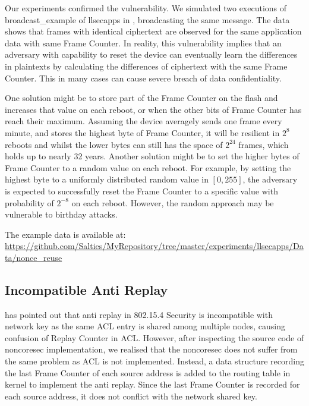 Our experiments confirmed the vulnerability. We simulated two executions of  broadcast\_example of llsecapps in , broadcasting the same message. The data shows that frames with identical ciphertext are observed for the same application data with same Frame Counter. In reality, this vulnerability implies that an adversary with capability to reset the device can eventually learn the differences in plaintexts by calculating the differences of ciphertext with the same Frame Counter. This in many cases can cause severe breach of data confidentiality.

One solution might be to store part of the Frame Counter on the flash and increases that value on each reboot, or when the other bits of Frame Counter has reach their maximum. Assuming the device averagely sends one frame every minute, and stores the highest byte of Frame Counter, it will be resilient in $2^8$ reboots and whilst the lower bytes can still has the space of $2^{24}$ frames, which holds up to nearly 32 years. Another solution might be to set the higher bytes of Frame Counter to a random value on each reboot. For example, by setting the highest byte to a uniformly distributed random value in $[0,255]$, the adversary is expected to successfully reset the Frame Counter to a specific value with probability of $2^{-8}$ on each reboot. However, the random approach may be vulnerable to birthday attacks.

The example data is available at: \\
\url{https://github.com/Salties/MyRepository/tree/master/experiments/llsecapps/Data/nonce_reuse}

\subsection{ Incompatible Anti Replay}

\cite{802154sec} has pointed out that anti replay in 802.15.4 Security is incompatible with network key as the same ACL entry is shared among multiple nodes, causing confusion of Replay Counter in ACL. However, after inspecting the source code of noncoresec implementation, we realised that the noncoresec does not suffer from the same problem as ACL is not implemented. Instead, a data structure recording the last Frame Counter of each source address is added to the routing table in kernel to implement the anti replay. Since the last Frame Counter is recorded for each source address, it does not conflict with the network shared key.

